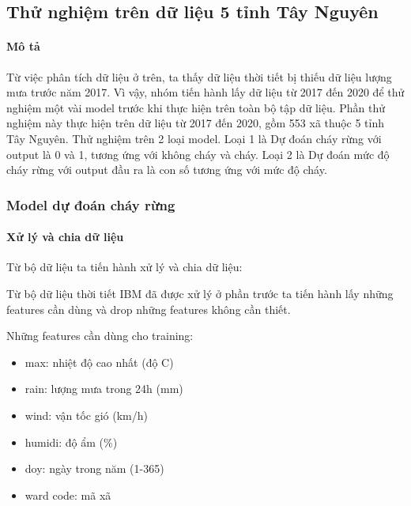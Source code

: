 \documentclass{article}
\begin{document}

\subsection{Thử nghiệm trên dữ liệu 5 tỉnh Tây Nguyên}
\paragraph{Mô tả} Từ việc phân tích dữ liệu ở trên, ta thấy dữ liệu thời tiết bị thiếu dữ liệu lượng mưa trước năm 2017. Vì vậy, nhóm tiến hành lấy dữ liệu từ 2017 đến 2020 để thử  nghiệm một vài model trước khi thực hiện trên toàn bộ tập dữ liệu. Phần thử nghiệm này thực hiện trên dữ liệu từ 2017 đến 2020, gồm 553 xã thuộc 5 tỉnh Tây Nguyên. Thử nghiệm trên 2 loại model. Loại 1 là Dự đoán cháy rừng với output là 0 và 1, tương ứng với không cháy và cháy. Loại 2 là Dự đoán mức độ cháy rừng với output đầu ra là con số tương ứng với mức độ cháy.

\subsubsection{Model dự đoán cháy rừng}
\paragraph{Xử lý và chia dữ liệu}

Từ bộ dữ liệu ta tiến hành xử lý và chia dữ liệu:

Từ bộ dữ liệu thời tiết IBM đã được xử lý ở phần trước ta tiến hành lấy những features cần dùng và drop những features không cần thiết.

Những features cần dùng cho training:
\begin{itemize}
	\item max: nhiệt độ cao nhất (độ C)
	\item rain: lượng mưa trong 24h (mm)
	\item wind: vận tốc gió (km/h)
	\item humidi: độ ẩm (\%)
	\item doy: ngày trong năm (1-365)
	\item ward code: mã xã
\end{itemize}
\end{document}
